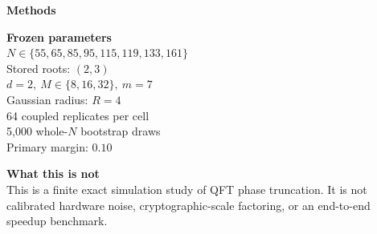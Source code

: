 \documentclass[12pt]{article}
\begin{document}
\pagecolor{white}
\color{MethodNavy}

{\fontsize{32}{36}\selectfont\bfseries Methods}

\vspace{0.25in}
\begin{center}
  
\end{center}

\vspace{0.18in}
\begin{minipage}[t]{0.64\linewidth}
  
\end{minipage}\hfill
\begin{minipage}[t]{0.32\linewidth}
  \colorbox{MethodPurple!8}{%
    \parbox{\dimexpr\linewidth-2\fboxsep\relax}{%
      \textbf{\large Frozen parameters}\\[1mm]
      \(\displaystyle N\in
      \{55,65,85,95,115,119,133,161\}\)\\[1mm]
      Stored roots: \((2,3)\)\\
      \(d=2,\ M\in\{8,16,32\},\ m=7\)\\
      Gaussian radius: \(R=4\)\\
      64 coupled replicates per cell\\
      5,000 whole-\(N\) bootstrap draws\\
      Primary margin: \(0.10\)
    }%
  }

  \vspace{0.18in}
  \colorbox{MethodOrange!8}{%
    \parbox{\dimexpr\linewidth-2\fboxsep\relax}{%
      \textbf{\large What this is not}\\[1mm]
      This is a finite exact simulation study of QFT phase truncation.
      It is not calibrated hardware noise, cryptographic-scale factoring,
      or an end-to-end speedup benchmark.
    }%
  }
\end{minipage}
\end{document}
